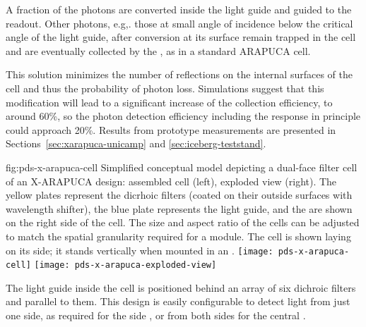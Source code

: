 A fraction of the photons are converted inside the light guide and guided to the readout. Other photons,  e.g,. those at small angle of incidence below the critical angle of the light guide, %
 after conversion at %
 its surface %
 remain trapped in the cell and are eventually collected by the , as in a standard ARAPUCA cell.
 
This solution minimizes the number of reflections on the internal surfaces of the cell and thus the probability of photon loss. Simulations suggest that this modification will lead to a significant increase of the collection efficiency, to around 60\%, so the photon detection efficiency including the  response in principle could approach 20\%. Results from prototype measurements are presented in Sections~\ref{sec:xarapuca-unicamp} and \ref{sec:iceberg-teststand}.

 \begin{dunefigure}{fig:pds-x-arapuca-cell}
{Simplified conceptual model depicting a %
dual-face filter cell of an X-ARAPUCA design: assembled cell (left),  exploded view (right). The yellow plates represent the dicrhoic filters (coated on their outside surfaces with wavelength shifter), the blue plate represents the light guide, and the  are shown on the right side of the cell. The size and aspect ratio of the cells can be adjusted to match the spatial granularity required for a  module. The cell is shown laying on its side; it stands vertically when mounted in an .} 
  \texttt{[image: pds-x-arapuca-cell]}
  \texttt{[image: pds-x-arapuca-exploded-view]}
\end{dunefigure}

The light guide inside the cell is positioned behind an array of six dichroic filters and parallel to them. 
This design is easily configurable to %
detect light from just one side, as required for the side , or from both sides for the central . 

